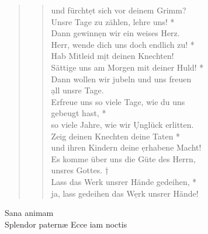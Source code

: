 \begin{quote}
\begin{verse}
\vin und fürcht\d et sich vor deinem Grimm? \\
Unsre Tage zu zählen, lehre uns! *\\
Dann gewinn\d en wir ein weises Herz.\\ 
\vin Herr, wende dich uns doch endlich zu! *\\
\vin Hab Mitleid m\d it deinen Knechten!\\
Sättige uns am Morgen mit deiner Huld! *\\
Dann wollen wir jubeln und uns freuen\\ \d all unsre Tage.\\ 
\vin Erfreue uns so viele Tage, wie du uns \\ \vin gebeugt hast, *\\
\vin so viele Jahre, wie wir \d Unglück erlitten.\\
Zeig deinen Knechten deine Taten *\\
und ihren Kindern deine \d erhabene Macht! \\
\vin Es komme über uns die Güte des Herrn, \\ \vin unsres Gottes. †\\
\vin Lass das Werk unsrer Hände gedeihen, *\\ \vin ja, lass gedeihen das W\d erk unsrer Hände!\\
\end{verse}

\end{quote}

\noindent{} Sana animam \\
\noindent{} Splendor paternæ  Ecce iam noctis 
\begin{flushleft}


\medskip

{\rm{
}}
\end{flushleft}

\def\greinitialformat#1{{\fontsize{40}{40}\selectfont #1}}
\gresetfirstlineaboveinitial{\small \textcolor{red}{Benedic.}}{}
\setaboveinitialseparation{0.72mm}


